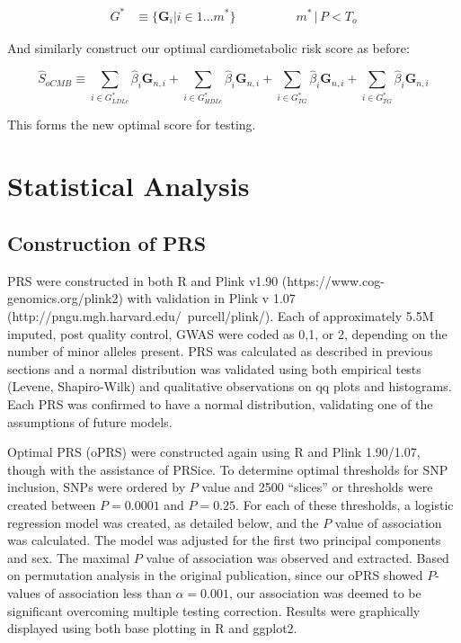 $$ \begin{aligned} G^* &\equiv \{ \mathbf{G}_i | i \in 1 \dots m^* \} &&&&&& m^* \, |  \, P < T_{o} \end{aligned}$$

And similarly construct our optimal cardiometabolic risk score as before:


$$ \hat{S}_{oCMB} \equiv \sum_{i \in G^*_{LDLc}} \hat{\beta}_i \mathbf{G}_{n, i} + \sum_{i \in G^*_{HDLc}} \hat{\beta}_i \mathbf{G}_{n, i} + \sum_{i \in G^*_{TG}} \hat{\beta}_i \mathbf{G}_{n, i} + \sum_{i \in G^*_{TG}} \hat{\beta}_i \mathbf{G}_{n, i} $$

This forms the new optimal score for testing.

\section{Statistical Analysis}

\subsection{Construction of \ac{PRS}}

\ac{PRS} were constructed in both R and Plink v1.90 (https://www.cog-genomics.org/plink2) with validation in Plink v 1.07 (http://pngu.mgh.harvard.edu/~purcell/plink/). Each of approximately 5.5M imputed, post quality control, \ac{GWAS} were coded as 0,1, or 2, depending on the number of minor alleles present. \ac{PRS} was calculated as described in previous sections and a normal distribution was validated using both empirical tests (Levene, Shapiro-Wilk) and qualitative observations on qq plots and histograms. Each \ac{PRS} was confirmed to have a normal distribution, validating one of the assumptions of future models. 

Optimal \ac{PRS} (\ac{oPRS}) were constructed again using R and Plink 1.90/1.07, though with the assistance of PRSice. \citep{Euesden2014} To determine optimal thresholds for \ac{SNP} inclusion, \acp{SNP} were ordered by $P$ value and 2500 ``slices'' or thresholds were created between $P = 0.0001$ and $P = 0.25$. For each of these thresholds, a logistic regression model was created, as detailed below, and the $P$ value of association was calculated. The model was adjusted for the first two principal components and sex. The maximal $P$ value of association was observed and extracted. Based on permutation analysis in the original publication, since our \ac{oPRS} showed $P$-values of association less than $\alpha = 0.001$, our association was deemed to be significant overcoming multiple testing correction. Results were graphically displayed using both base plotting in R and ggplot2. \citep{ggplot}


